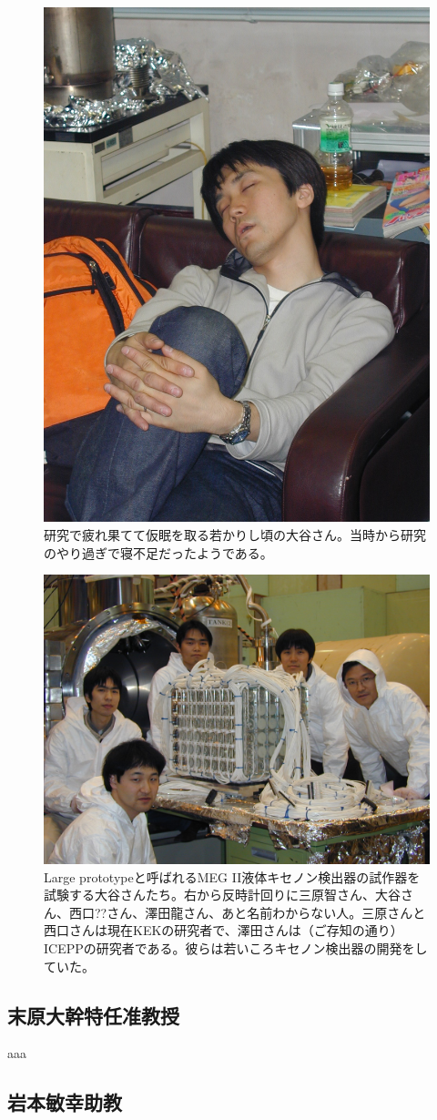 \begin{figure}
  \vspace*{-\intextsep}
  \centering
  \includegraphics[width=0.3\columnwidth]{fig/wataru_sleeping.jpg}
  \caption{研究で疲れ果てて仮眠を取る若かりし頃の大谷さん。当時から研究のやり過ぎで寝不足だったようである。}
  \label{fig:wataru_sleeping}
\end{figure}

\begin{figure}[h]
  \centering
  \includegraphics[width=0.7\columnwidth,clip]{fig/wataru.jpg}
  \caption{Large prototypeと呼ばれるMEG II液体キセノン検出器の試作器を試験する大谷さんたち。右から反時計回りに三原智さん、大谷さん、西口??さん、澤田龍さん、あと名前わからない人。三原さんと西口さんは現在KEKの研究者で、澤田さんは（ご存知の通り）ICEPPの研究者である。彼らは若いころキセノン検出器の開発をしていた。}
  \label{fig:wataru}
\end{figure}


\subsection{末原大幹特任准教授}
aaa




\subsection{岩本敏幸助教}

